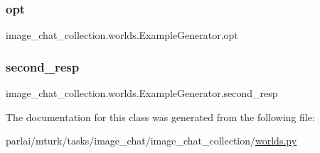 \subsubsection{\texorpdfstring{opt}{opt}}
{\footnotesize\ttfamily image\+\_\+chat\+\_\+collection.\+worlds.\+Example\+Generator.\+opt}

\mbox{\label{classimage__chat__collection_1_1worlds_1_1ExampleGenerator_a1567fe5f2514d3ca587135876f662c91}} 
\subsubsection{\texorpdfstring{second\+\_\+resp}{second\_resp}}
{\footnotesize\ttfamily image\+\_\+chat\+\_\+collection.\+worlds.\+Example\+Generator.\+second\+\_\+resp}



The documentation for this class was generated from the following file\+:\begin{DoxyCompactItemize}
\item 
parlai/mturk/tasks/image\+\_\+chat/image\+\_\+chat\+\_\+collection/\hyperlink{parlai_2mturk_2tasks_2image__chat_2image__chat__collection_2worlds_8py}{worlds.\+py}\end{DoxyCompactItemize}
